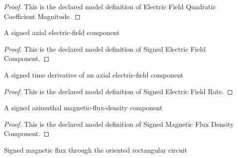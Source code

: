 \begin{proof}
  This is the declared model definition of Electric Field Quadratic Coefficient Magnitude.
\end{proof}
\begin{definition}
  \label{def:physics:phyx-mini-0983:phyxminiproblems-problemphyxmini0983-signedelectricfieldcomponent}
  A signed axial electric-field component
\end{definition}
\begin{proof}
  This is the declared model definition of Signed Electric Field Component.
\end{proof}
\begin{definition}
  \label{def:physics:phyx-mini-0983:phyxminiproblems-problemphyxmini0983-signedelectricfieldrate}
  A signed time derivative of an axial electric-field component
\end{definition}
\begin{proof}
  This is the declared model definition of Signed Electric Field Rate.
\end{proof}
\begin{definition}
  \label{def:physics:phyx-mini-0983:phyxminiproblems-problemphyxmini0983-signedmagneticfluxdensitycomponent}
  A signed azimuthal magnetic-flux-density component
\end{definition}
\begin{proof}
  This is the declared model definition of Signed Magnetic Flux Density Component.
\end{proof}
\begin{definition}
  \label{def:physics:phyx-mini-0983:phyxminiproblems-problemphyxmini0983-signedmagneticflux}
  Signed magnetic flux through the oriented rectangular circuit
\end{definition}
